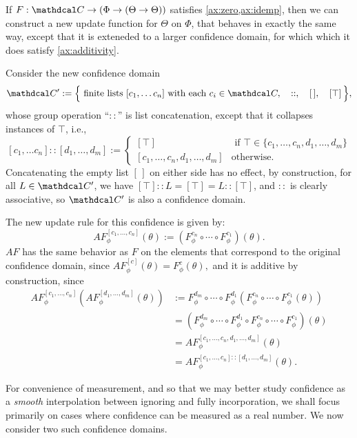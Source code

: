 \documentclass{article}
\def\confdom{\mathdcal C}
\begin{document}
\begin{prop} \label{prop:free-additivity}
	If $F: \confdom \to (\Phi \to (\Theta \to \Theta))$ satisfies \cref{ax:zero,ax:idemp}, then we can construct a new update
	function for $\Theta$ on $\Phi$, that behaves in exactly the same way, except that it is exteneded to a larger confidence domain, for which which it does satisfy \cref{ax:additivity}. 
\end{prop}
\begin{lproof}
Consider the new confidence domain
$$
	\confdom' := \Big\{ \text{ finite lists } [c_1, \ldots c_n]
		\text{ with each } c_i \in \confdom, 
		\quad
		::,
		\quad
		[\,],
		\quad
		[\top]
		\,
	\Big\},
$$
whose group operation ``$::$'' is list concatenation, except that it collapses instances of $\top$, i.e., 
\[ 
	[c_1, \ldots c_n] :: [d_1, \ldots, d_m]
	 := \begin{cases}
		 [\top] & \text{ if } \top \in \{c_1, \ldots, c_n,d_1, \ldots,d_m \} \\
		 [c_1, \ldots, c_{n}, d_1, \ldots, d_m] & \text{otherwise.}
 \end{cases}
\]
Concatenating the empty list $[\,]$ on either side has no effect,
by construction, for all $L \in \confdom'$, we have $[\top] :: L = [\top] = L :: [\top]$, 
and $::$ is clearly associative, so $\confdom'$ is also a confidence domain.

The new update rule for this confidence is given by:
	\[
		AF^{[c_1, \ldots, c_n]}_\phi (\theta)  :=
				(F^{c_n}_\phi \circ \cdots \circ F^{c_1}_\phi) (\theta).
	\]
$AF$ has the same behavior as $F$ on the elements that correspond to the original confidence domain, since
$
	AF^{[c]}_\phi(\theta) = F^c_\phi(\theta),
$
and it is additive by construction, since
\begin{align*}
AF^{[c_1, \ldots, c_n]}_\phi ( AF^{[d_1, \ldots, d_m]}_\phi (\theta) )
		&:=
			F^{d_m}_\phi \circ \cdots \circ F^{d_1}_\phi (
			F^{c_n}_\phi \circ \cdots \circ F^{c_1}_\phi (\theta))\\
		&= (F^{d_m}_\phi \circ \cdots \circ F^{d_1}_\phi \circ
		F^{c_n}_\phi \circ \cdots \circ F^{c_1}_\phi) (\theta) \\
		&= AF^{[c_1, \ldots, c_n, d_1, \ldots, d_m]}_\phi (\theta) \\
		&= AF^{[c_1, \ldots, c_n] :: [d_1, \ldots, d_m]}_\phi (\theta).
\end{align*}
\end{lproof}%
For convenience of measurement, and so that we may better study confidence as a \emph{smooth} interpolation between ignoring and fully incorporation, we shall focus primarily on cases where confidence can be measured as a real number.
We now consider two such confidence domains.
\end{document}
